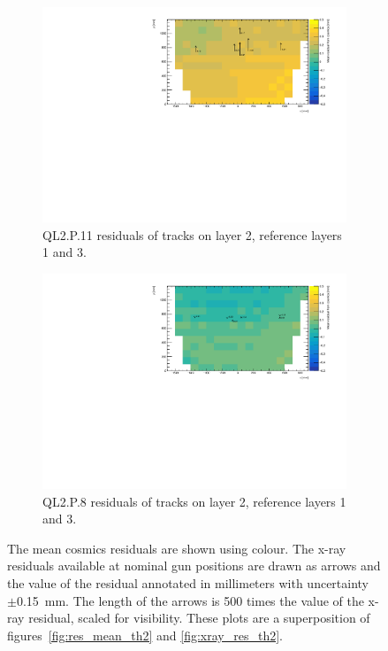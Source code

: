 \newpage
\thispagestyle{empty}
\begin{figure}
\centering
\begin{subfigure}{\textwidth}
  \centering
  \includegraphics[width=\linewidth]{figures/QL2P11_compare_residuals_th2_layer2_fixedlayers13.pdf}
  \caption{QL2.P.11 residuals of tracks on layer 2, reference layers 1 and 3.}
  \label{fig:res_compare_th2_ql2p11}
\end{subfigure}%
\vspace*{\floatsep}
\begin{subfigure}{\textwidth}
  \centering
  \includegraphics[width=\linewidth]{figures/QL2P08_compare_residuals_th2_layer2_fixedlayers13.pdf}
  \caption{QL2.P.8 residuals of tracks on layer 2, reference layers 1 and 3.}
  \label{fig:res_compare_th2_ql2p8}
\end{subfigure}
\caption{The mean cosmics residuals are shown using colour. The x-ray residuals available at nominal gun positions are drawn as arrows and the value of the residual annotated in millimeters with uncertainty $\pm$\SI{0.15}{mm}. The length of the arrows is 500 times the value of the x-ray residual, scaled for visibility. These plots are a superposition of figures~\ref{fig:res_mean_th2} and \ref{fig:xray_res_th2}.}
\label{fig:res_compare_th2}
\end{figure}
\newpage
\restoregeometry

